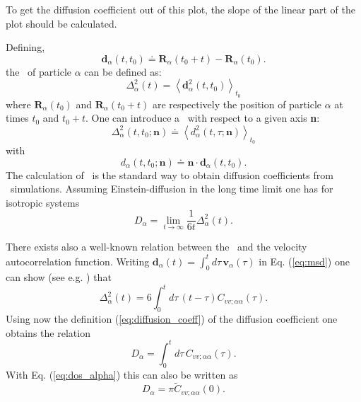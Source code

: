 \documentclass[a4paper,11pt]{report}
\begin{document}
To get the diffusion coefficient out of this plot, the slope of the linear part of the plot should be calculated.

Defining,
\begin{equation}
\textbf{d}_{\alpha}(t,t_0) \doteq \textbf{R}_\alpha(t_0 + t) - \textbf{R}_\alpha(t_0).
\end{equation}
the \MSD\ of particle $\alpha$ can be defined as:
\begin{equation}
\label{eq:msd}
\Delta^2_\alpha(t) = \left\langle \textbf{d}^2_\alpha(t,t_0) \right\rangle_{t_0}
\end{equation}
where $\textbf{R}_\alpha(t_0)$ and $\textbf{R}_\alpha(t_0 + t)$ are respectively the position of particle $\alpha$ at 
times $t_0$ and $t_0+t$.
One can introduce a \MSD\ with respect to a given axis \textbf{n}:
\begin{equation}
\label{eq:msd_n}
\Delta^2_\alpha(t,t_0;\textbf{n}) \doteq \left\langle
d^2_\alpha(t,\tau;\textbf{n})\right\rangle_{t_0}
\end{equation}
with
\begin{equation}
d_{\alpha}(t,t_0;\textbf{n}) \doteq \textbf{n}\cdot \textbf{d}_{\alpha}(t,t_0).
\end{equation}
The calculation of \MSD\ is the standard way
to obtain diffusion coefficients from \MD\ simulations. Assuming
Einstein-diffusion in the long time limit one has for isotropic
systems
\begin{equation}
\label{eq:diffusion_coeff}
D_\alpha = \lim_{t\to\infty} \frac{1}{6t} \Delta^2_\alpha(t).
\end{equation}

There exists also a well-known relation between the \MSD\ and the velocity 
autocorrelation function. Writing $\textbf{d}_\alpha(t) = \int_{0}^{t}d\tau\,\textbf{v}_\alpha(\tau)$  in Eq.
(\ref{eq:msd}) one can show (see e.g. \cite{Yip:1980}) that 
\begin{equation}
\label{eq:msd_vacf}
\Delta^2_\alpha(t) = 6 \int_{0}^{t}d\tau\,(t - \tau)
C_{vv ; \alpha\alpha}(\tau).
\end{equation}
Using now the definition (\ref{eq:diffusion_coeff}) of the diffusion coefficient one
obtains the relation
\begin{equation}
\label{eq:d_vacf}
D_\alpha = \int_{0}^{t}d\tau\, C_{vv ; \alpha\alpha}(\tau).
\end{equation}
With Eq. (\ref{eq:dos_alpha}) this can  also be written as
\begin{equation}
\label{eq:d_dos}
D_\alpha = \pi \tilde C_{vv ; \alpha\alpha}(0).
\end{equation}
\end{document}
